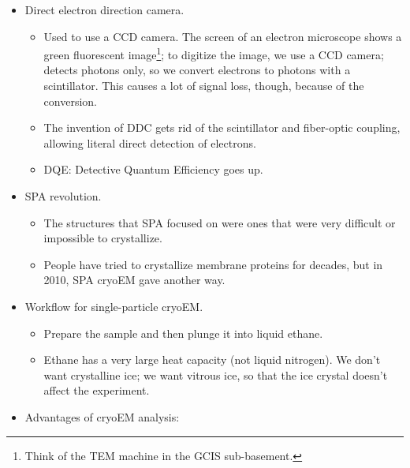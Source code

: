 \documentclass[../notes.tex]{subfiles}
\begin{document}
\begin{itemize}
\begin{itemize}
        \item Bad detection: Only limited amount of signal is recorded.
        \item Beam-induced motion: Hard to avoid.
        \item Sample heterogeneity: No crystal lattice as constraints.
        \item Problems 1-3 were solved with a good camera in 2012. Multiple exposures aligned and averaged (take multiple shots [a movie] over 4-5 seconds and then align the relative positions and average).
    \end{itemize}
    \item Direct electron direction camera.
    \begin{itemize}
        \item Used to use a CCD camera. The screen of an electron microscope shows a green fluorescent image\footnote{Think of the TEM machine in the GCIS sub-basement.}; to digitize the image, we use a CCD camera; detects photons only, so we convert electrons to photons with a scintillator. This causes a lot of signal loss, though, because of the conversion.
        \item The invention of DDC gets rid of the scintillator and fiber-optic coupling, allowing literal direct detection of electrons.
        \item DQE: Detective Quantum Efficiency goes up.
    \end{itemize}
    \item SPA revolution.
    \begin{itemize}
        \item The structures that SPA focused on were ones that were very difficult or impossible to crystallize.
        \item People have tried to crystallize membrane proteins for decades, but in 2010, SPA cryoEM gave another way.
    \end{itemize}
    \item Workflow for single-particle cryoEM.
    \begin{itemize}
        \item Prepare the sample and then plunge it into liquid ethane.
        \item Ethane has a very large heat capacity (not liquid nitrogen). We don't want crystalline ice; we want vitrous ice, so that the ice crystal doesn't affect the experiment.
    \end{itemize}
    \item Advantages of cryoEM analysis:

\end{itemize}
\end{document}
